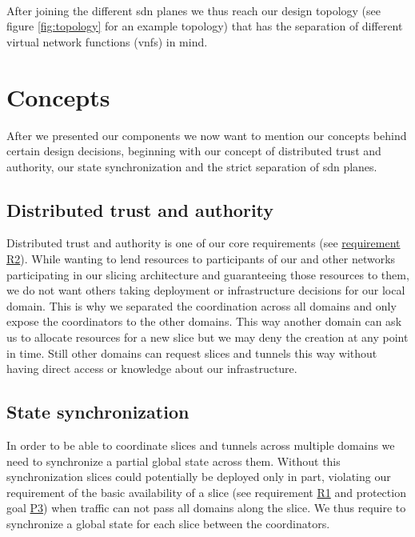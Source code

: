 \paragraph{} After joining the different \acrshort{sdn} planes we thus reach our design topology (see figure \ref{fig:topology} for an example topology) that has the separation of different virtual network functions (\acrshort{vnf}s) in mind.


\section{Concepts}
\label{design_concepts}
After we presented our components we now want to mention our concepts behind certain design decisions, beginning with our concept of distributed trust and authority, our state synchronization and the strict separation of \acrshort{sdn} planes.

\subsection{Distributed trust and authority}
Distributed trust and authority is one of our core requirements (see \hyperref[R2]{requirement R2}). While wanting to lend resources to participants of our and other networks participating in our slicing architecture and guaranteeing those resources to them, we do not want others taking deployment or infrastructure decisions for our local domain. This is why we separated the coordination across all domains and only expose the coordinators to the other domains. This way another domain can ask us to allocate resources for a new slice but we may deny the creation at any point in time. Still other domains can request slices and tunnels this way without having direct access or knowledge about our infrastructure.

\subsection{State synchronization}
In order to be able to coordinate slices and tunnels across multiple domains we need to synchronize a partial global state across them. Without this synchronization slices could potentially be deployed only in part, violating our requirement of the basic availability of a slice (see requirement \hyperref[R1]{R1} and protection goal \hyperref[P3]{P3}) when traffic can not pass all domains along the slice. We thus require to synchronize a global state for each slice between the coordinators.

